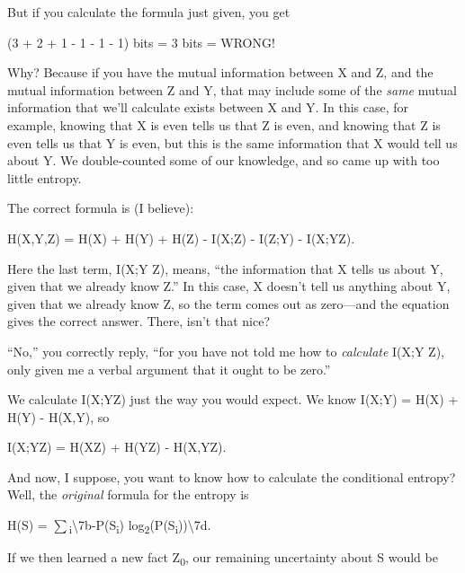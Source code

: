 {
 But if you calculate the formula just given, you get}

{\centering
 (3 + 2 + 1 - 1 - 1 - 1) bits = 3 bits = WRONG!
\par}


\bigskip

{
 Why? Because if you have the mutual information between X and Z,
and the mutual information between Z and Y, that may include some of
the \textit{same} mutual information that we'll
calculate exists between X and Y. In this case, for example, knowing
that X is even tells us that Z is even, and knowing that Z is even
tells us that Y is even, but this is the same information that X would
tell us about Y. We double-counted some of our knowledge, and so came
up with too little entropy. }

{
 The correct formula is (I believe):}

{\centering
 H(X,Y,Z) = H(X) + H(Y) + H(Z) - I(X;Z) - I(Z;Y) -
I(X;Y{\textbar}Z).
\par}


\bigskip

{
 Here the last term, I(X;Y {\textbar}Z), means,
``the information that X tells us about Y, given that
we already know Z.'' In this case, X
doesn't tell us anything about Y, given that we already
know Z, so the term comes out as zero---and the equation gives the
correct answer. There, isn't that nice? }

{
 ``No,'' you correctly reply,
``for you have not told me how to \textit{calculate}
I(X;Y {\textbar}Z), only given me a verbal argument that it ought to be
zero.''}

{
 We calculate I(X;Y{\textbar}Z) just the way you would expect. We
know I(X;Y) = H(X) + H(Y) - H(X,Y), so}

{\centering
 I(X;Y{\textbar}Z) = H(X{\textbar}Z) + H(Y{\textbar}Z) -
H(X,Y{\textbar}Z).
\par}


\bigskip

{
 And now, I suppose, you want to know how to calculate the
conditional entropy? Well, the \textit{original} formula for the
entropy is}

{\centering
 H(S) =
${\sum}$\textsubscript{i}{\textbackslash}{\textquotesingle}7b-P(S\textsubscript{i})
{\texttimes}
log\textsubscript{2}(P(S\textsubscript{i})){\textbackslash}{\textquotesingle}7d.
\par}


\bigskip

{
 If we then learned a new fact Z\textsubscript{0}, our remaining
uncertainty about S would be}

